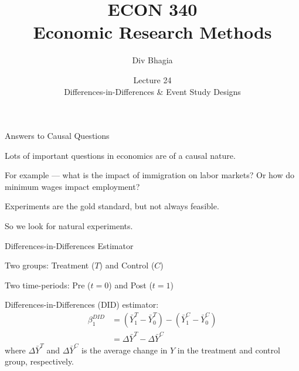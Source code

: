 \documentclass{./../div_teaching_slides}
\begin{document}
\title{ECON 340 \\ Economic Research Methods}
\author{Div Bhagia}
\date{Lecture 24 \\ Differences-in-Differences \& Event Study Designs}


\begin{frame}
\maketitle
\end{frame}

\begin{frame}{Answers to Causal Questions}
\begin{witemize}
  \item Lots of important questions in economics are of a causal nature. 
  \item For example --- what is the impact of immigration on labor markets? Or how do minimum wages impact employment?
  \item Experiments are the gold standard, but not always feasible. 
  \item So we look for natural experiments. 
\end{witemize}
\end{frame}


\begin{frame}{Differences-in-Differences Estimator}
\begin{witemize}
  \item Two groups: Treatment ($T$) and Control ($C$)
  \item Two time-periods: Pre ($t=0$) and Post ($t=1$)
  \item Differences-in-Differences (DID) estimator:
 \begin{align*}
  	\beta_1^{DID} &= (\bar{Y}^T_1 - \bar{Y}^T_0)-(\bar{Y}^C_1 - \bar{Y}^C_0) 
  	\\[0.5em] 
  	& = \Delta \bar{Y}^T - \Delta \bar{Y}^C
  \end{align*}
  where $\Delta \bar{Y}^T$ and $\Delta \bar{Y}^C$ is the average change in $Y$ in the treatment and control group, respectively. 
\end{witemize}
\end{frame}
\end{document}
